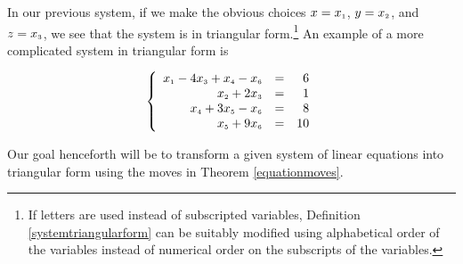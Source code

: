 \smallskip

In our previous system, if we make the obvious choices $x = x_{\mbox{\tiny$1$}}$, $y = x_{\mbox{\tiny$2$}}$, and $z = x_{\mbox{\tiny$3$}}$, we see that the system is in triangular form.\footnote{If letters are used instead of subscripted variables, Definition \ref{systemtriangularform} can be suitably modified using alphabetical order of the variables instead of numerical order on the subscripts of the variables.}   An example of a more complicated system in triangular form is

\[ \left\{ \begin{array}{rcr} x_{\mbox{\tiny$1$}} - 4x_{\mbox{\tiny$3$}} + x_{\mbox{\tiny$4$}} - x_{\mbox{\tiny$6$}} & = & 6 \\ x_{\mbox{\tiny$2$}} + 2x_{\mbox{\tiny$3$}} & = & 1 \\ x_{\mbox{\tiny$4$}} + 3x_{\mbox{\tiny$5$}} - x_{\mbox{\tiny$6$}} & = & 8 \\ x_{\mbox{\tiny$5$}} + 9x_{\mbox{\tiny$6$}} & = & 10 \end{array} \right.\]

Our goal henceforth will be to transform a given system of linear equations into triangular form using the moves in Theorem \ref{equationmoves}.

